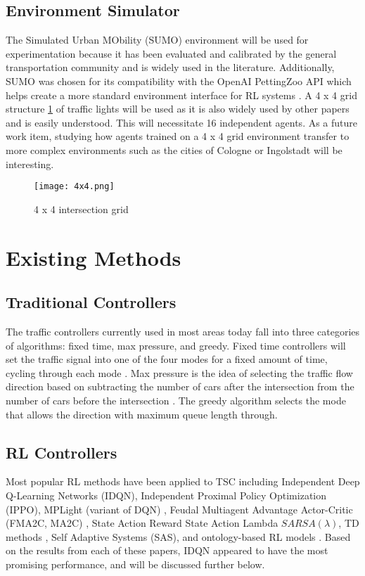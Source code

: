 \documentclass[letterpaper]{article} %
\begin{document}
\subsection{Environment Simulator}
The Simulated Urban MObility (SUMO) environment will be used for experimentation because it has been evaluated and calibrated by the general transportation community \cite{ault2021reinforcement} \cite{sumorl} and is widely used in the literature.
Additionally, SUMO was chosen for its compatibility with the OpenAI PettingZoo API which helps create a more standard environment interface for RL systems \cite{terry2021pettingzoo}.
A 4 x 4 grid structure \ref{fig:intersection_grid} of traffic lights will be used as it is also widely used by other papers \cite{Almeida2022MultiagentRL} and is easily understood.
This will necessitate 16 independent agents.
As a future work item, studying how agents trained on a 4 x 4 grid environment transfer to more complex environments such as the cities of Cologne or Ingolstadt will be interesting.

\begin{figure}[htbp]
  \centering
  \texttt{[image: 4x4.png]}
  \caption{4 x 4 intersection grid \cite{DBLP:journals/corr/abs-2004-04778}}
  \label{fig:intersection_grid}
\end{figure}

\section{Existing Methods}
\subsection{Traditional Controllers}
The traffic controllers currently used in most areas today fall into three categories of algorithms: fixed time, max pressure, and greedy.
Fixed time controllers will set the traffic signal into one of the four modes for a fixed amount of time, cycling through each mode \cite{ault2021reinforcement}.
Max pressure is the idea of selecting the traffic flow direction based on subtracting the number of cars after the intersection from the number of cars before the intersection \cite{Chen_Wei_Xu_Zheng_Yang_Xiong_Xu_Li_2020}.
The greedy algorithm selects the mode that allows the direction with maximum queue length through.

\subsection{RL Controllers}
Most popular RL methods have been applied to TSC including Independent Deep Q-Learning Networks (IDQN), Independent Proximal Policy Optimization (IPPO), MPLight (variant of DQN) \cite{Chen_Wei_Xu_Zheng_Yang_Xiong_Xu_Li_2020}, Feudal Multiagent Advantage Actor-Critic (FMA2C, MA2C) \cite{DBLP:journals/corr/abs-1903-04527}, State Action Reward State Action Lambda \(SARSA(\lambda)\), TD methods \cite{Reza2023}, Self Adaptive Systems (SAS), and ontology-based RL models \cite{Ghanadbashi2023}.
Based on the results from each of these papers, IDQN appeared to have the most promising performance, and will be discussed further below.
\end{document}
